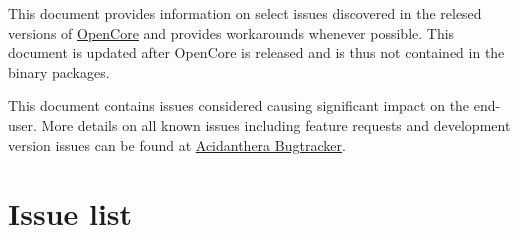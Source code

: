 \documentclass[]{article}
\begin{document}
This document provides information on select issues discovered in the relesed
versions of \href{https://github.com/acidanthera/OpenCorePkg}{OpenCore}
and provides workarounds whenever possible. This document is updated
after OpenCore is released and is thus not contained in the binary packages.

This document contains issues considered causing significant impact on the end-user.
More details on all known issues including feature requests and development version issues
can be found at \href{https://github.com/acidanthera/bugtracker}{Acidanthera Bugtracker}.

\section{Issue list}\label{issuelist}
\end{document}
